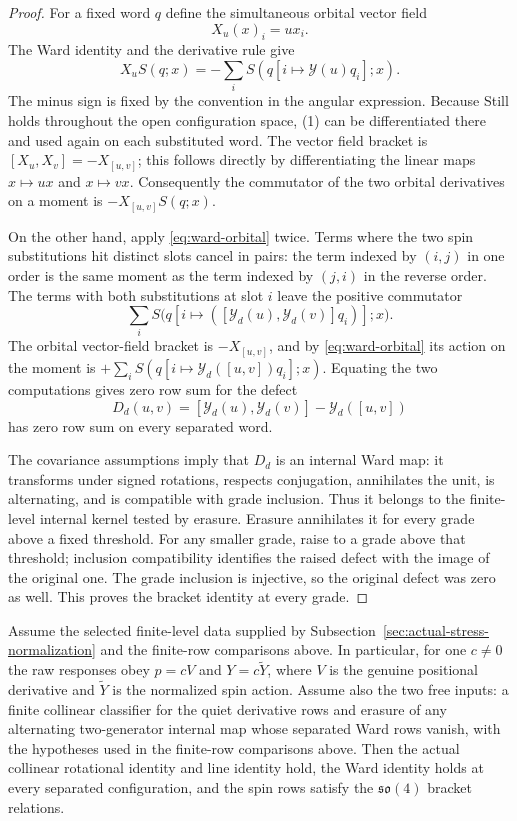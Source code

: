 \begin{proof}
For a fixed word $q$ define the simultaneous orbital vector field
\[
 X_u(x)_i=u x_i.
\]
The Ward identity and the derivative rule give
\begin{equation}
 X_u S(q;x)=-\sum_i S(q[i\mapsto\mathcal Y(u)q_i];x).
\label{eq:ward-orbital}
\end{equation}
The minus sign is fixed by the convention in the angular expression.
Because Still holds throughout the open configuration space, (1) can be
differentiated there and used again on each substituted word.  The vector
field bracket is $[X_u,X_v]=-X_{[u,v]}$; this follows directly by
differentiating the linear maps $x\mapsto ux$ and $x\mapsto vx$.
Consequently the commutator of the two orbital derivatives on a moment
is $-X_{[u,v]}S(q;x)$.

On the other hand, apply \eqref{eq:ward-orbital} twice.  Terms where the two spin substitutions
hit distinct slots cancel in pairs: the term indexed by $(i,j)$ in one
order is the same moment as the term indexed by $(j,i)$ in the reverse
order.  The terms with both substitutions at slot $i$ leave the positive
commutator
\[
 \sum_i S\bigl(q[i\mapsto
  ([\mathcal Y_d(u),\mathcal Y_d(v)]q_i)];x\bigr).
\]
The orbital vector-field bracket is $-X_{[u,v]}$, and by \eqref{eq:ward-orbital} its action on
the moment is $+\sum_i S(q[i\mapsto\mathcal Y_d([u,v])q_i];x)$.  Equating
the two computations gives zero row sum for the defect
\[
 D_d(u,v)=[\mathcal Y_d(u),\mathcal Y_d(v)]-\mathcal Y_d([u,v])
\]
has zero row sum on every separated word.

The covariance assumptions imply that $D_d$ is an internal Ward map:
it transforms under signed rotations, respects conjugation, annihilates
the unit, is alternating, and is compatible with grade inclusion.  Thus
it belongs to the finite-level internal kernel tested by erasure.  Erasure
annihilates it for every grade above a fixed threshold.  For any smaller
grade, raise to a grade above that threshold; inclusion compatibility
identifies the raised defect with the image of the original one.  The
grade inclusion is injective, so the original defect was zero as well.
This proves the bracket identity at every grade.
\end{proof}

\begin{corollary}
\label{cor:selected-ward-package}
Assume the selected finite-level data supplied by
Subsection~\ref{sec:actual-stress-normalization} and the finite-row
comparisons above.  In particular, for one $c\ne0$ the
raw responses obey $p=cV$ and $Y=c\widetilde Y$, where $V$ is the genuine
positional derivative and $\widetilde Y$ is the normalized spin action.
Assume also the two free inputs: a finite collinear classifier for the
quiet derivative rows and erasure of any alternating two-generator internal
map whose separated Ward rows vanish, with the hypotheses used in the
finite-row comparisons above. Then the
actual collinear rotational identity and line identity hold, the Ward
identity holds at every separated configuration, and the spin rows satisfy
the $\mathfrak{so}(4)$ bracket relations.
\end{corollary}

